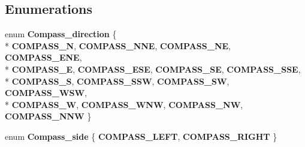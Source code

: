 \subsection*{Enumerations}
\begin{DoxyCompactItemize}
\item 
enum {\bfseries Compass\+\_\+direction} \{ \\*
{\bfseries C\+O\+M\+P\+A\+S\+S\+\_\+N}, 
{\bfseries C\+O\+M\+P\+A\+S\+S\+\_\+\+N\+NE}, 
{\bfseries C\+O\+M\+P\+A\+S\+S\+\_\+\+NE}, 
{\bfseries C\+O\+M\+P\+A\+S\+S\+\_\+\+E\+NE}, 
\\*
{\bfseries C\+O\+M\+P\+A\+S\+S\+\_\+E}, 
{\bfseries C\+O\+M\+P\+A\+S\+S\+\_\+\+E\+SE}, 
{\bfseries C\+O\+M\+P\+A\+S\+S\+\_\+\+SE}, 
{\bfseries C\+O\+M\+P\+A\+S\+S\+\_\+\+S\+SE}, 
\\*
{\bfseries C\+O\+M\+P\+A\+S\+S\+\_\+S}, 
{\bfseries C\+O\+M\+P\+A\+S\+S\+\_\+\+S\+SW}, 
{\bfseries C\+O\+M\+P\+A\+S\+S\+\_\+\+SW}, 
{\bfseries C\+O\+M\+P\+A\+S\+S\+\_\+\+W\+SW}, 
\\*
{\bfseries C\+O\+M\+P\+A\+S\+S\+\_\+W}, 
{\bfseries C\+O\+M\+P\+A\+S\+S\+\_\+\+W\+NW}, 
{\bfseries C\+O\+M\+P\+A\+S\+S\+\_\+\+NW}, 
{\bfseries C\+O\+M\+P\+A\+S\+S\+\_\+\+N\+NW}
 \}\hypertarget{bicorder-compass_8h_a642eb4472a57f1a847ee101e3b7af5ba}{}\label{bicorder-compass_8h_a642eb4472a57f1a847ee101e3b7af5ba}

\item 
enum {\bfseries Compass\+\_\+side} \{ {\bfseries C\+O\+M\+P\+A\+S\+S\+\_\+\+L\+E\+FT}, 
{\bfseries C\+O\+M\+P\+A\+S\+S\+\_\+\+R\+I\+G\+HT}
 \}\hypertarget{bicorder-compass_8h_a7e36843c53aaafda9795876e659ffe7b}{}\label{bicorder-compass_8h_a7e36843c53aaafda9795876e659ffe7b}

\end{DoxyCompactItemize}
